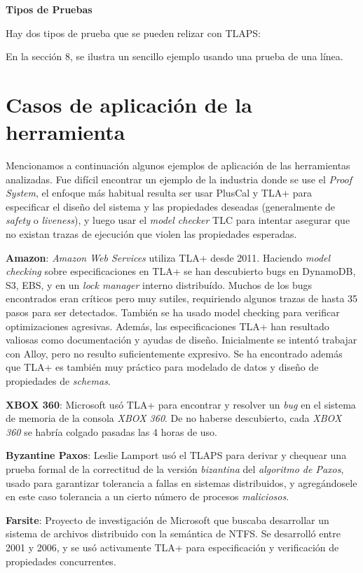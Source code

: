 \documentclass[spanish]{llncs}
\begin{document}
  \textbf{Tipos de Pruebas}
  
  Hay dos tipos de prueba que se pueden relizar con TLAPS:
  
  

  En la sección 8, se ilustra un sencillo ejemplo usando una prueba de una línea.

\section{Casos de aplicación de la herramienta}
Mencionamos a continuación algunos ejemplos de aplicación de las herramientas analizadas.
Fue difícil encontrar un ejemplo de la industria donde se use el \textit{Proof System}, el enfoque más habitual resulta ser usar PlusCal y TLA+ para especificar el diseño del sistema y las propiedades deseadas (generalmente de \textit{safety} o \textit{liveness}), y luego usar el \textit{model checker} TLC para intentar asegurar que no existan trazas de ejecución que violen las propiedades esperadas.

\textbf{Amazon}: \textit{Amazon Web Services} utiliza TLA+ desde 2011. Haciendo \textit{model checking} sobre especificaciones en TLA+ se han descubierto bugs
en DynamoDB, S3, EBS, y en un \textit{lock manager} interno distribuído.
Muchos de los bugs encontrados eran críticos pero muy sutiles, requiriendo algunos trazas de hasta 35 pasos para ser detectados.
También se ha usado model checking para verificar optimizaciones agresivas.
Además, las especificaciones TLA+ han resultado valiosas como documentación y ayudas de diseño.
Inicialmente se intentó trabajar con Alloy, pero no resulto suficientemente expresivo.
Se ha encontrado además que TLA+ es también muy práctico para modelado de datos y diseño de propiedades de \textit{schemas}. \cite{amazon}

\textbf{XBOX 360}: Microsoft usó TLA+ para encontrar y resolver un \textit{bug} en el sistema de memoria de la consola \textit{XBOX 360}.
De no haberse descubierto, cada \textit{XBOX 360} se habría colgado pasadas las 4 horas de uso.
\cite{xbox360}

\textbf{Byzantine Paxos}: Leslie Lamport usó el TLAPS para derivar y chequear una prueba formal de la correctitud de la versión \textit{bizantina} del \textit{algoritmo de Paxos},
usado para garantizar tolerancia a fallas en sistemas distribuidos, y agregándosele en este caso tolerancia a un cierto número de procesos \textit{maliciosos}. \cite{byzpaxos}

\textbf{Farsite}: Proyecto de investigación de Microsoft que buscaba desarrollar un sistema de archivos distribuido con la semántica de NTFS.
Se desarrolló entre 2001 y 2006, y se usó activamente TLA+ para especificación y verificación de propiedades concurrentes. \cite{farsite}
\end{document}
